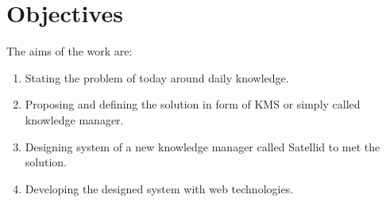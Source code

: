 \section{Objectives}
\label{sec:objectives}

The aims of the work are:

\begin{enumerate}
\item Stating the problem of today around daily knowledge.
\item Proposing and defining the solution in form of \ac{KMS} or simply called knowledge manager.
\item Designing system of a new knowledge manager called Satellid to met the solution.
\item Developing the designed system with web technologies.
\end{enumerate}
